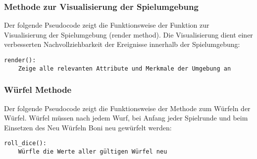 \subsubsection{Methode zur Visualisierung der Spielumgebung}
\begin{minipage}{\linewidth}
Der folgende Pseudocode zeigt die Funktionsweise der Funktion zur Visualisierung der Spielumgebung (render method). Die Visualisierung dient einer verbesserten Nachvollziehbarkeit der Ereignisse innerhalb der Spielumgebung:
\vspace{0.5cm}
\begin{lstlisting}[caption={Methode zur Visualisierung der Spielumgebung}]
render():
	Zeige alle relevanten Attribute und Merkmale der Umgebung an
\end{lstlisting}
\end{minipage}

\subsubsection{Würfel Methode}
\begin{minipage}{\linewidth}
Der folgende Pseudocode zeigt die Funktionsweise der Methode zum Würfeln der Würfel. Würfel müssen nach jedem Wurf, bei Anfang jeder Spielrunde und beim Einsetzen des Neu Würfeln Boni neu gewürfelt werden:
\vspace{0.5cm}
\begin{lstlisting}[caption={Würfel Methode}]
roll_dice():
	Würfle die Werte aller gültigen Würfel neu
\end{lstlisting}
\end{minipage}

